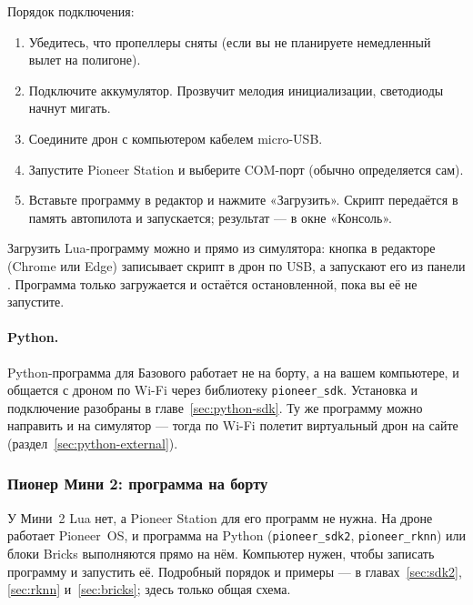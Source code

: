 Порядок подключения:
\begin{enumerate}
    \item Убедитесь, что пропеллеры сняты (если вы не планируете немедленный вылет на полигоне).
    \item Подключите аккумулятор. Прозвучит мелодия инициализации, светодиоды начнут мигать.
    \item Соедините дрон с компьютером кабелем micro-USB.
    \item Запустите Pioneer Station и выберите COM-порт (обычно определяется сам).
    \item Вставьте программу в редактор и нажмите «Загрузить». Скрипт передаётся в память автопилота и запускается; результат --- в окне «Консоль».
\end{enumerate}

Загрузить Lua-программу можно и прямо из симулятора: кнопка  в редакторе (Chrome или Edge) записывает скрипт в дрон по USB, а запускают его из панели . Программа только загружается и остаётся остановленной, пока вы её не запустите.

\paragraph{Python.} Python-программа для Базового работает не на борту, а на вашем компьютере, и общается с дроном по Wi-Fi через библиотеку \texttt{pioneer\_sdk}. Установка и подключение разобраны в главе~\ref{sec:python-sdk}. Ту же программу можно направить и на симулятор --- тогда по Wi-Fi полетит виртуальный дрон на сайте (раздел~\ref{sec:python-external}).

\subsubsection{Пионер Мини 2: программа на борту}

У Мини~2 Lua нет, а Pioneer Station для его программ не нужна. На дроне работает Pioneer~OS, и программа на Python (\texttt{pioneer\_sdk2}, \texttt{pioneer\_rknn}) или блоки Bricks выполняются прямо на нём. Компьютер нужен, чтобы записать программу и запустить её. Подробный порядок и примеры --- в главах~\ref{sec:sdk2}, \ref{sec:rknn} и~\ref{sec:bricks}; здесь только общая схема.

